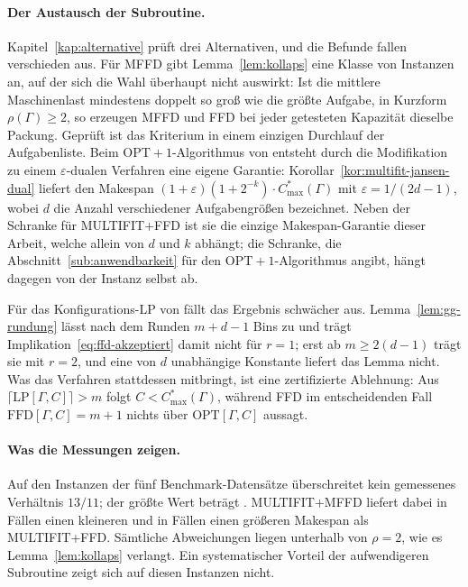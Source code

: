 \paragraph{Der Austausch der Subroutine.}
Kapitel~\ref{kap:alternative} prüft drei Alternativen, und die Befunde fallen verschieden aus.
Für MFFD gibt Lemma~\ref{lem:kollaps} eine Klasse von Instanzen an, auf der sich die Wahl
überhaupt nicht auswirkt: Ist die mittlere Maschinenlast mindestens doppelt so groß wie die
größte Aufgabe, in Kurzform $\rho(\Gamma) \ge 2$, so erzeugen MFFD und FFD bei jeder
getesteten Kapazität dieselbe Packung.
Geprüft ist das Kriterium in einem einzigen Durchlauf der Aufgabenliste.
Beim $\mathrm{OPT}+1$-Algorithmus von \textcite{jansen_solisoba2010} entsteht durch die
Modifikation zu einem $\varepsilon$-dualen Verfahren eine eigene Garantie:
Korollar~\ref{kor:multifit-jansen-dual} liefert den Makespan
$(1+\varepsilon)(1+2^{-k}) \cdot C^{*}_{\max}(\Gamma)$ mit $\varepsilon = 1/(2d-1)$, wobei $d$
die Anzahl verschiedener Aufgabengrößen bezeichnet.
Neben der Schranke für MULTIFIT+FFD ist sie die einzige Makespan-Garantie dieser Arbeit, welche
allein von $d$ und $k$ abhängt; die Schranke, die Abschnitt~\ref{sub:anwendbarkeit} für den
$\mathrm{OPT}+1$-Algorithmus angibt, hängt dagegen von der Instanz selbst ab.

Für das Konfigurations-LP von \textcite{gilmore_gomory1961} fällt das Ergebnis schwächer aus.
Lemma~\ref{lem:gg-rundung} lässt nach dem Runden $m + d - 1$ Bins zu und trägt
Implikation~\eqref{eq:ffd-akzeptiert} damit nicht für $r = 1$; erst ab $m \ge 2(d-1)$ trägt sie
mit $r = 2$, und eine von $d$ unabhängige Konstante liefert das Lemma nicht.
Was das Verfahren stattdessen mitbringt, ist eine zertifizierte Ablehnung: Aus
$\lceil \mathrm{LP}[\Gamma,C] \rceil > m$ folgt $C < C^{*}_{\max}(\Gamma)$, während FFD im
entscheidenden Fall $\mathrm{FFD}[\Gamma,C] = m+1$ nichts über
$\mathrm{OPT}[\Gamma,C]$ aussagt.

\paragraph{Was die Messungen zeigen.}
Auf den \EvalInstanzen{} Instanzen der fünf Benchmark-Datensätze überschreitet kein gemessenes
Verhältnis $13/11$; der größte Wert beträgt \EvalMaxRatioOpt.
MULTIFIT+MFFD liefert dabei in \EvalWins{} Fällen einen kleineren und in \EvalLosses{} Fällen
einen größeren Makespan als MULTIFIT+FFD.
Sämtliche \EvalAbweichungen{} Abweichungen liegen unterhalb von $\rho = 2$, wie es
Lemma~\ref{lem:kollaps} verlangt.
Ein systematischer Vorteil der aufwendigeren Subroutine zeigt sich auf diesen Instanzen nicht.

